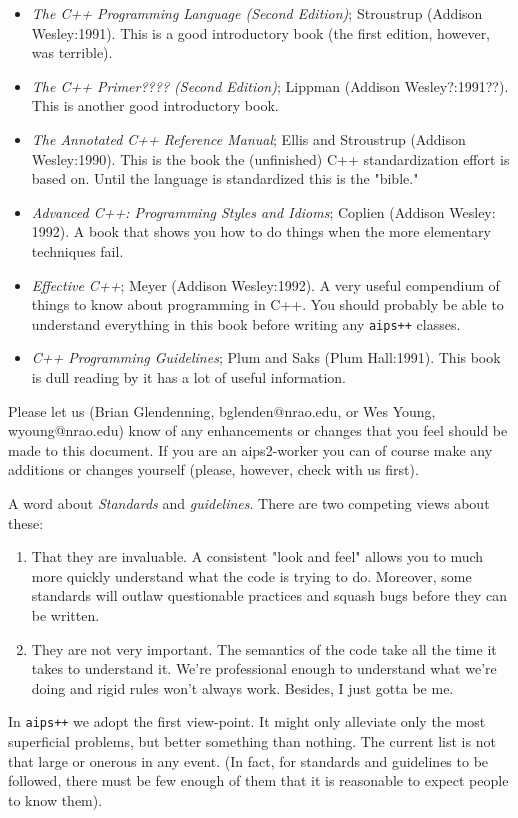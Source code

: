 \label{Intro:C++ book reccomendations}
\begin {itemize}
\item
{\em The C++ Programming Language (Second Edition)}; Stroustrup (Addison
Wesley:1991). This is a good introductory book (the first edition,
however, was terrible).
\item
{\em The C++ Primer???? (Second Edition)}; Lippman (Addison
Wesley?:1991??). This is another good introductory book.
\item
{\em The Annotated C++ Reference Manual}; Ellis and Stroustrup
(Addison Wesley:1990). This is the book the (unfinished) C++
standardization effort is based on. Until the language is standardized
this is the "bible."
\item
{\em Advanced C++: Programming Styles and Idioms}; Coplien (Addison
Wesley: 1992). A book that shows you how to do things when the more
elementary techniques fail.
\item
{\em Effective C++}; Meyer (Addison Wesley:1992). A very useful
compendium of things
to know about programming in C++. You should probably be able to
understand everything in this book before writing any {\tt aips++}
classes.
\item
{\em C++ Programming Guidelines}; Plum and Saks (Plum Hall:1991). This
book is dull reading by it has a lot of useful information.
\end{itemize}

Please let us (Brian Glendenning, bglenden@nrao.edu, or Wes Young,
wyoung@nrao.edu) know of any enhancements or
changes that you feel should be made to this document.
If you are an aips2-worker you can
of course make any additions or changes yourself (please, however, check
with us first).

A word about {\em Standards} and {\em guidelines}. There are two
competing views about these:

\begin {enumerate}
\item
That they are invaluable. A consistent "look and feel" allows you to much
more quickly understand what the code is trying to do. Moreover, some
standards will outlaw questionable practices and squash bugs before they
can be written.
\item
They are not very important. The semantics of the code take all the time
it takes to understand it. We're professional enough to understand what
we're doing and rigid rules won't always work. Besides, I just gotta be
me.
\end{enumerate}

In {\tt aips++} we adopt the first view-point. It might only alleviate
only the most superficial problems, but better something than nothing.
The current list is not that large or onerous in any event. (In fact,
for standards and guidelines to be followed, there must be few enough of
them that it is reasonable to expect people to know them).
